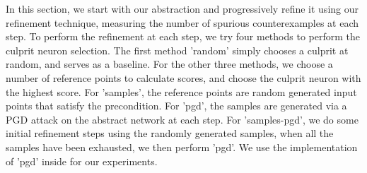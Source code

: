 In this section, we start with our abstraction and progressively refine it using
our refinement technique, measuring the number of spurious counterexamples at
each step. To perform the refinement at each step, we try four methods to
perform the culprit neuron selection. The first method 'random' simply chooses a
culprit at random, and serves as a baseline. For the other three methods, we
choose a number of reference points to calculate scores, and choose the culprit
neuron with the highest score. For 'samples', the reference points are random
generated input points that satisfy the precondition. For 'pgd', the samples are
generated via a PGD  attack on the abstract network at each step. For
'samples-pgd', we do some initial refinement steps using the randomly generated
samples, when all the samples have been exhausted, we then perform 'pgd'. We use
the implementation of 'pgd' inside \abcrown for our experiments.

